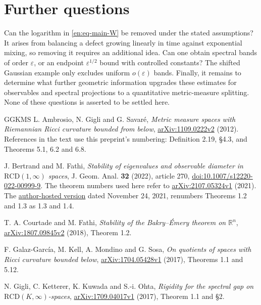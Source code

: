 \documentclass[12pt]{amsart}
\theoremstyle{definition}
\theoremstyle{remark}
\numberwithin{equation}{section}
\newcommand{\R}{\mathbb{R}}
\newcommand{\RCD}{\mathrm{RCD}}
\theoremstyle{jpplain}
\begin{document}
\section{Further questions}

Can the logarithm in \eqref{en:eq-main-W} be removed under the stated
assumptions?  It arises from balancing a defect growing linearly in time
against exponential mixing, so removing it requires an additional idea.
Can one obtain spectral bands of order $\varepsilon$, or an endpoint
$\varepsilon^{1/2}$ bound with controlled constants?  The shifted Gaussian
example only excludes uniform $o(\varepsilon)$ bands.  Finally, it remains
to determine what further geometric information upgrades these estimates
for observables and spectral projections to a quantitative metric-measure
splitting.  None of these questions is asserted to be settled here.

\begin{thebibliography}{GGKMS}
L. Ambrosio, N. Gigli and G. Savar\'e,
\emph{Metric measure spaces with Riemannian Ricci curvature bounded from below},
\href{https://arxiv.org/abs/1109.0222v2}{arXiv:1109.0222v2} (2012).
References in the text use this preprint's numbering: Definition 2.19,
\S4.3, and Theorems 5.1, 6.2 and 6.8.

J. Bertrand and M. Fathi,
\emph{Stability of eigenvalues and observable diameter in
$\RCD(1,\infty)$ spaces},
J. Geom. Anal. \textbf{32} (2022), article 270,
\href{https://doi.org/10.1007/s12220-022-00999-9}{doi:10.1007/s12220-022-00999-9}.
The theorem numbers used here refer to
\href{https://arxiv.org/abs/2107.05324v1}{arXiv:2107.05324v1} (2021).
The \href{https://www.math.univ-toulouse.fr/~bertrand/BertrandFathi.pdf}{author-hosted version}
dated November 24, 2021, renumbers Theorems 1.2 and 1.3 as 1.3 and 1.4.

T. A. Courtade and M. Fathi,
\emph{Stability of the Bakry--\'Emery theorem on $\R^n$},
\href{https://arxiv.org/abs/1807.09845v2}{arXiv:1807.09845v2} (2018),
Theorem 1.2.

F. Galaz-Garc\'ia, M. Kell, A. Mondino and G. Sosa,
\emph{On quotients of spaces with Ricci curvature bounded below},
\href{https://arxiv.org/abs/1704.05428v1}{arXiv:1704.05428v1} (2017),
Theorems 1.1 and 5.12.

N. Gigli, C. Ketterer, K. Kuwada and S.-i. Ohta,
\emph{Rigidity for the spectral gap on $\RCD(K,\infty)$-spaces},
\href{https://arxiv.org/abs/1709.04017v1}{arXiv:1709.04017v1} (2017),
Theorem 1.1 and \S2.
\end{thebibliography}
\end{document}
